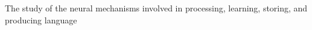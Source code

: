 The study of the neural mechanisms involved in processing, learning, storing, and producing language
